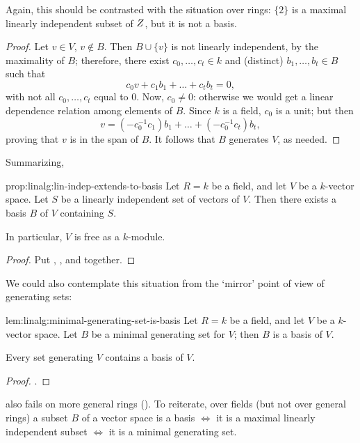 Again, this should be contrasted with the situation over rings:
$\{2\}$ is a maximal linearly independent subset of $Z$, but it is
not a basis.
\begin{proof}
  Let $v \in V$, $v \notin B$. Then $B \cup \{v\}$ is not linearly
  independent, by the maximality of $B$; therefore, there exist
  $c_0, \dots, c_t \in k$ and (distinct) $b_1, \dots, b_t \in B$ such
  that
  \[c_0 v + c_1 b_1 + \dots + c_t b_t = 0,\] with not all
  $c_0, \dots, c_t$ equal to $0$. Now, $c_0 \neq 0$: otherwise we
  would get a linear dependence relation among elements of $B$. Since
  $k$ is a field, $c_0$ is a unit; but then
  \[v = (-c_0^{-1} c_1) b_1 + \dots + (-c_0^{-1} c_t) b_t,\] proving
  that $v$ is in the span of $B$. It follows that $B$ generates $V$,
  as needed.
\end{proof}
Summarizing,

\begin{prop}{}{prop:linalg:lin-indep-extends-to-basis}
  Let $R = k$ be a field, and let $V$ be a $k$-vector space. Let $S$
  be a linearly independent set of vectors of $V$. Then there exists a
  basis $B$ of $V$ containing $S$.

  In particular, $V$ is free as a $k$-module.
\end{prop}

\begin{proof}
  Put , , and 
  together.
\end{proof}
We could also contemplate this situation from the `mirror' point of
view of generating sets:

\begin{lem}{}{lem:linalg:minimal-generating-set-is-basis}
  Let $R = k$ be a field, and let $V$ be a $k$-vector space. Let $B$
  be a minimal generating set for $V$; then $B$ is a basis of $V$.

  Every set generating $V$ contains a basis of $V$.
\end{lem}

\begin{proof}
  .
\end{proof}

 also fails on more general rings
(). To reiterate,
over fields (but not over general rings) a subset $B$ of a vector
space is a basis $\iff$ it is a maximal linearly independent subset
$\iff$ it is a minimal generating set.

